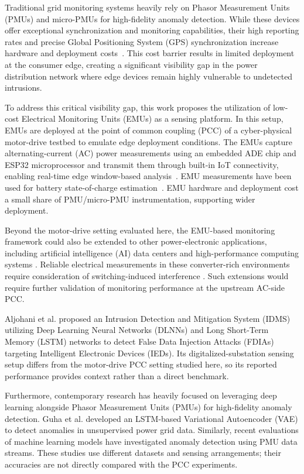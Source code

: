 \documentclass[conference]{IEEEtran}
\begin{document}
Traditional grid monitoring systems heavily rely on Phasor Measurement Units (PMUs) and micro-PMUs for high-fidelity anomaly detection. While these devices offer exceptional synchronization and monitoring capabilities, their high reporting rates and precise Global Positioning System (GPS) synchronization increase hardware and deployment costs~\cite{vonmeier2017}. This cost barrier results in limited deployment at the consumer edge, creating a significant visibility gap in the power distribution network where edge devices remain highly vulnerable to undetected intrusions.

To address this critical visibility gap, this work proposes the utilization of low-cost Electrical Monitoring Units (EMUs) as a sensing platform. In this setup, EMUs are deployed at the point of common coupling (PCC) of a cyber-physical motor-drive testbed to emulate edge deployment conditions. The EMUs capture alternating-current (AC) power measurements using an embedded ADE chip and ESP32 microprocessor and transmit them through built-in IoT connectivity, enabling real-time edge window-based analysis~\cite{najarEMU2026}. EMU measurements have been used for battery state-of-charge estimation~\cite{najarSOC2026}. EMU hardware and deployment cost a small share of PMU/micro-PMU instrumentation, supporting wider deployment. 

Beyond the motor-drive setting evaluated here, the EMU-based monitoring framework could also be extended to other power-electronic applications, including artificial intelligence (AI) data centers and high-performance computing systems \cite{Habibi2026DataCenters,Lotfi2026FCML}.
Reliable electrical measurements in these converter-rich environments require consideration of switching-induced interference \cite{Omidi2026HybridSensor}.
Such extensions would require further validation of monitoring performance at the upstream AC-side PCC.



Aljohani et al. \cite{aljohani2024} proposed an Intrusion Detection and Mitigation System (IDMS) utilizing Deep Learning Neural Networks (DLNNs) and Long Short-Term Memory (LSTM) networks to detect False Data Injection Attacks (FDIAs) targeting Intelligent Electronic Devices (IEDs). Its digitalized-substation sensing setup differs from the motor-drive PCC setting studied here, so its reported performance provides context rather than a direct benchmark.


Furthermore, contemporary research has heavily focused on leveraging deep learning alongside Phasor Measurement Units (PMUs) for high-fidelity anomaly detection. Guha et al. \cite{guha} developed an LSTM-based Variational Autoencoder (VAE) to detect anomalies in unsupervised power grid data. Similarly, recent evaluations of machine learning models \cite{pmu_lstm_2025} have investigated anomaly detection using PMU data streams. These studies use different datasets and sensing arrangements; their accuracies are not directly compared with the PCC experiments.
\end{document}
